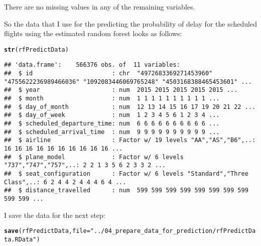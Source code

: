 \documentclass{article}\usepackage[]{graphicx}\usepackage[]{color}
\makeatletter
\newcommand{\hlstr}[1]{\textcolor[rgb]{0.192,0.494,0.8}{#1}}%
\newcommand{\hlstd}[1]{\textcolor[rgb]{0.345,0.345,0.345}{#1}}%
\newcommand{\hlkwc}[1]{\textcolor[rgb]{0.333,0.667,0.333}{#1}}%
\newcommand{\hlkwd}[1]{\textcolor[rgb]{0.737,0.353,0.396}{\textbf{#1}}}%
\newenvironment{kframe}{%
 \def\at@end@of@kframe{}%
 \ifinner\ifhmode%
  \def\at@end@of@kframe{\end{minipage}}%
  \begin{minipage}{\columnwidth}%
 \fi\fi%
 \def\FrameCommand##1{\hskip\@totalleftmargin \hskip-\fboxsep
 \colorbox{shadecolor}{##1}\hskip-\fboxsep
     \hskip-\linewidth \hskip-\@totalleftmargin \hskip\columnwidth}%
 \MakeFramed {\advance\hsize-\width
   \@totalleftmargin\z@ \linewidth\hsize
   \@setminipage}}%
 {\par\unskip\endMakeFramed%
 \at@end@of@kframe}
\newenvironment{knitrout}{}{} %
\makeatother
\begin{document}
There are no missing values in any of the remaining variables.

So the data that I use for the predicting the probability of delay for the scheduled flights using the estimated random forest looks as follows:
\begin{knitrout}
\color{fgcolor}\begin{kframe}
\begin{alltt}
\hlkwd{str}\hlstd{(rfPredictData)}
\end{alltt}
\begin{verbatim}
## 'data.frame':	566376 obs. of  11 variables:
##  $ id                      : chr  "4972683369271453960" "4755622236989466036" "1092083446069765248" "4503168388465453601" ...
##  $ year                    : num  2015 2015 2015 2015 2015 ...
##  $ month                   : num  1 1 1 1 1 1 1 1 1 1 ...
##  $ day_of_month            : num  12 13 14 15 16 17 19 20 21 22 ...
##  $ day_of_week             : num  1 2 3 4 5 6 1 2 3 4 ...
##  $ scheduled_departure_time: num  6 6 6 6 6 6 6 6 6 6 ...
##  $ scheduled_arrival_time  : num  9 9 9 9 9 9 9 9 9 9 ...
##  $ airline                 : Factor w/ 19 levels "AA","AS","B6",..: 16 16 16 16 16 16 16 16 16 16 ...
##  $ plane_model             : Factor w/ 6 levels "737","747","757",..: 2 2 1 3 5 6 2 3 3 2 ...
##  $ seat_configuration      : Factor w/ 6 levels "Standard","Three Class",..: 6 2 4 4 2 4 4 4 6 4 ...
##  $ distance_travelled      : num  599 599 599 599 599 599 599 599 599 599 ...
\end{verbatim}
\end{kframe}
\end{knitrout}

I save the data for the next step:
\begin{knitrout}
\color{fgcolor}\begin{kframe}
\begin{alltt}
\hlkwd{save}\hlstd{(rfPredictData,} \hlkwc{file}\hlstd{=}\hlstr{"../04_prepare_data_for_prediction/rfPredictData.RData"}\hlstd{)}
\end{alltt}
\end{kframe}
\end{knitrout}
\end{document}
